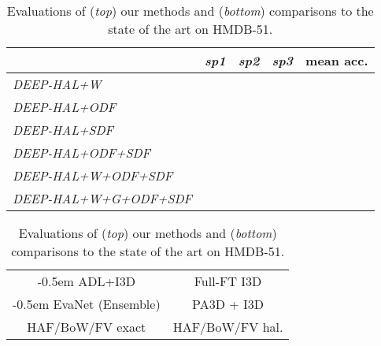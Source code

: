 \begin{table}[t]\parbox{.99\linewidth}{
\setlength{\tabcolsep}{0.12em}
\renewcommand{\arraystretch}{0.70}
\centering
\begin{tabular}{ l c c c c }
\toprule
 & {\em sp1} & {\em sp2} & {\em sp3} & mean acc. \\
\hline
{\em DEEP-HAL+W} &  &  &  & \\
{\em DEEP-HAL+ODF} &  &  &  & \\
{\em DEEP-HAL+SDF} &  &  &  & \\
{\em DEEP-HAL+ODF+SDF} &  &  &  & \\
{\em DEEP-HAL+W+ODF+SDF} &  &  &  & \\
{\em DEEP-HAL+W+G+ODF+SDF}  &  &  &  & \\
\midrule
\end{tabular}
}
\parbox{.99\linewidth}{
\setlength{\tabcolsep}{0.12em}
\renewcommand{\arraystretch}{0.70}
\fontsize{9}{9}\selectfont
\centering
\begin{tabular}{ c c }
\kern-0.5em ADL+I3D  \cite{anoop_advers} &  Full-FT I3D  \cite{i3d_net}\\
\kern-0.5em EvaNet (Ensemble)  \cite{Piergiovanni_2019_ICCV} & PA3D + I3D  \cite{Yan_2019_CVPR}\\
 HAF/BoW/FV exact  \cite{Wang_2019_ICCV} & HAF/BoW/FV hal.  \cite{Wang_2019_ICCV}\\
\bottomrule
\end{tabular}
}
\caption{Evaluations of ({\em top}) our methods and ({\em bottom}) comparisons to the state of the art on  HMDB-51.}
\vspace{-0.3cm}
\label{tab:hmdb51f}
\end{table}

